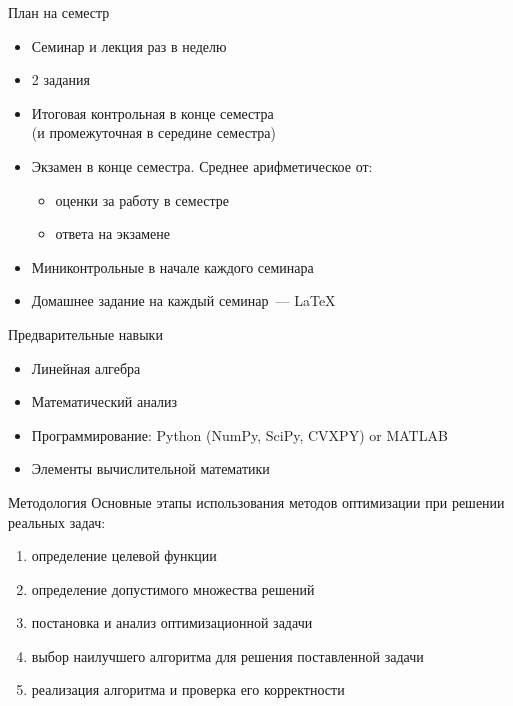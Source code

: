 \documentclass[12pt]{beamer}
\begin{document}
\begin{frame}{План на семестр}
\begin{itemize}
\item Семинар и лекция раз в неделю
\item 2 задания
\item Итоговая контрольная в конце семестра \\ (и промежуточная в середине семестра)
\item Экзамен в конце семестра. Среднее арифметическое от:
\begin{itemize}
\item оценки за работу в семестре
\item ответа на экзамене
\end{itemize}
\item Миниконтрольные в начале каждого семинара
\item Домашнее задание на каждый семинар~--- \LaTeX
\end{itemize}
\end{frame}

\begin{frame}{Предварительные навыки}
\begin{itemize}
\item Линейная алгебра
\item Математический анализ
\item Программирование: Python (NumPy, SciPy, CVXPY) or MATLAB
\item Элементы вычислительной математики
\end{itemize}
\end{frame}

\begin{frame}{Методология}
Основные этапы использования методов оптимизации при решении реальных задач:
\begin{enumerate}
\item определение целевой функции
\item определение допустимого множества решений
\item постановка и анализ оптимизационной задачи
\item выбор наилучшего алгоритма для решения поставленной задачи
\item реализация алгоритма и проверка его корректности
\end{enumerate}

\end{frame}
\end{document}
